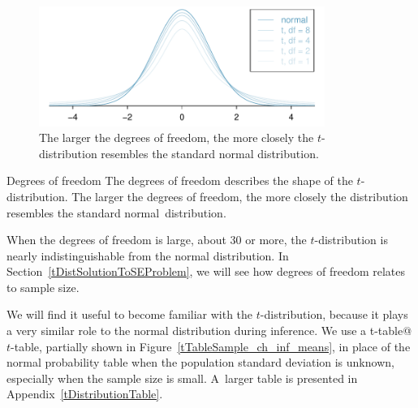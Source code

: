 \begin{figure}[h]
\centering
\includegraphics[width=0.83\textwidth]{ch_inference_for_means/figures/tDistConvergeToNormalDist/tDistConvergeToNormalDist}
\caption{The larger the degrees of freedom, the more closely the $t$-distribution resembles the standard normal distribution.}
\label{tDistConvergeToNormalDist}
\end{figure}

\begin{onebox}{Degrees of freedom}
The degrees of freedom describes the shape of the $t$-distribution. The larger the degrees of freedom, the more closely the distribution resembles the standard normal~distribution.\end{onebox}

When the degrees of freedom is large, about 30 or more, the $t$-distribution is nearly indistinguishable from the normal distribution. In Section~\ref{tDistSolutionToSEProblem}, we will see how degrees of freedom relates to sample size.

We will find it useful to become familiar with the $t$-distribution, because it plays a very similar role to the normal distribution during inference.  We use a 
    {t-table@$t$-table}, partially shown in Figure~\ref{tTableSample_ch_inf_means}, in place of the normal probability table when the population standard deviation is unknown, especially when the sample size is small. A~larger table is presented in Appendix~\ref{tDistributionTable}.


